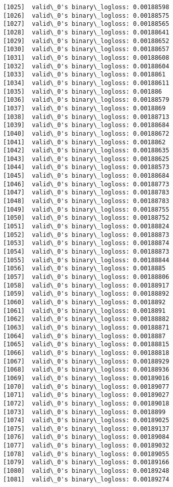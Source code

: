 \documentclass[11pt]{article}
\begin{document}
\begin{Verbatim}[commandchars=\\\{\}]
[1025]	valid\_0's binary\_logloss: 0.00188598
[1026]	valid\_0's binary\_logloss: 0.00188575
[1027]	valid\_0's binary\_logloss: 0.00188565
[1028]	valid\_0's binary\_logloss: 0.00188641
[1029]	valid\_0's binary\_logloss: 0.00188652
[1030]	valid\_0's binary\_logloss: 0.00188657
[1031]	valid\_0's binary\_logloss: 0.00188608
[1032]	valid\_0's binary\_logloss: 0.00188604
[1033]	valid\_0's binary\_logloss: 0.0018861
[1034]	valid\_0's binary\_logloss: 0.00188611
[1035]	valid\_0's binary\_logloss: 0.001886
[1036]	valid\_0's binary\_logloss: 0.00188579
[1037]	valid\_0's binary\_logloss: 0.0018869
[1038]	valid\_0's binary\_logloss: 0.00188713
[1039]	valid\_0's binary\_logloss: 0.00188684
[1040]	valid\_0's binary\_logloss: 0.00188672
[1041]	valid\_0's binary\_logloss: 0.0018862
[1042]	valid\_0's binary\_logloss: 0.00188635
[1043]	valid\_0's binary\_logloss: 0.00188625
[1044]	valid\_0's binary\_logloss: 0.00188573
[1045]	valid\_0's binary\_logloss: 0.00188684
[1046]	valid\_0's binary\_logloss: 0.00188773
[1047]	valid\_0's binary\_logloss: 0.00188783
[1048]	valid\_0's binary\_logloss: 0.00188783
[1049]	valid\_0's binary\_logloss: 0.00188755
[1050]	valid\_0's binary\_logloss: 0.00188752
[1051]	valid\_0's binary\_logloss: 0.00188824
[1052]	valid\_0's binary\_logloss: 0.00188873
[1053]	valid\_0's binary\_logloss: 0.00188874
[1054]	valid\_0's binary\_logloss: 0.00188873
[1055]	valid\_0's binary\_logloss: 0.00188844
[1056]	valid\_0's binary\_logloss: 0.0018885
[1057]	valid\_0's binary\_logloss: 0.00188806
[1058]	valid\_0's binary\_logloss: 0.00188917
[1059]	valid\_0's binary\_logloss: 0.00188892
[1060]	valid\_0's binary\_logloss: 0.0018892
[1061]	valid\_0's binary\_logloss: 0.0018891
[1062]	valid\_0's binary\_logloss: 0.00188882
[1063]	valid\_0's binary\_logloss: 0.00188871
[1064]	valid\_0's binary\_logloss: 0.0018887
[1065]	valid\_0's binary\_logloss: 0.00188815
[1066]	valid\_0's binary\_logloss: 0.00188818
[1067]	valid\_0's binary\_logloss: 0.00188929
[1068]	valid\_0's binary\_logloss: 0.00188936
[1069]	valid\_0's binary\_logloss: 0.00189016
[1070]	valid\_0's binary\_logloss: 0.00189077
[1071]	valid\_0's binary\_logloss: 0.00189027
[1072]	valid\_0's binary\_logloss: 0.00189018
[1073]	valid\_0's binary\_logloss: 0.0018899
[1074]	valid\_0's binary\_logloss: 0.00189025
[1075]	valid\_0's binary\_logloss: 0.00189137
[1076]	valid\_0's binary\_logloss: 0.00189084
[1077]	valid\_0's binary\_logloss: 0.00189032
[1078]	valid\_0's binary\_logloss: 0.00189055
[1079]	valid\_0's binary\_logloss: 0.00189166
[1080]	valid\_0's binary\_logloss: 0.00189248
[1081]	valid\_0's binary\_logloss: 0.00189274

\end{Verbatim}
\end{document}
